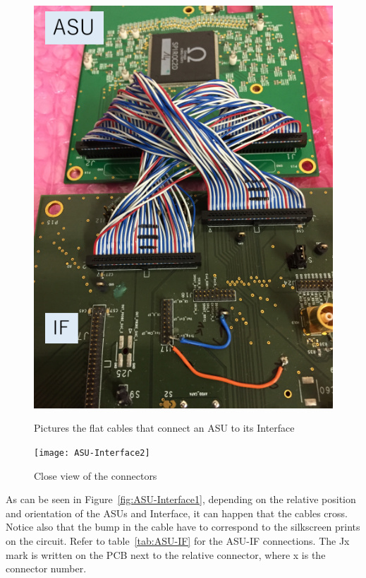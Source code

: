 \begin{figure}[H]
  \centering
  \begin{minipage}{0.4\linewidth}
    \centering \includegraphics[width=0.9\linewidth,frame]{ASU-Interface1}
    \caption{Pictures the flat cables that connect an ASU to its
      Interface}\label{fig:ASU-Interface1}
  \end{minipage}%
  \begin{minipage}{0.5\linewidth}
    \centering \texttt{[image: ASU-Interface2]}
    \caption{Close view of the connectors}\label{fig:ASU-Interface2}
  \end{minipage}
\end{figure}
As can be seen in Figure~\ref{fig:ASU-Interface1}, depending on the relative
position and orientation of the ASUs and Interface, it can happen that the
cables cross. Notice also that the bump in the cable have to correspond to the
silkscreen prints on the circuit. Refer to table~\ref{tab:ASU-IF} for the ASU-IF
connections. The Jx mark is written on the PCB next to the relative connector,
where x is the connector number.
